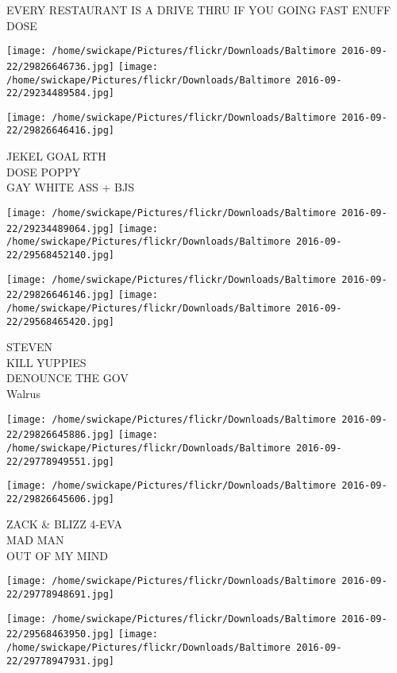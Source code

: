\documentclass[10pt,letterpaper]{article}
\begin{document}
EVERY RESTAURANT IS A DRIVE THRU IF YOU GOING FAST ENUFF\\
DOSE\\
\pagebreak

\texttt{[image: /home/swickape/Pictures/flickr/Downloads/Baltimore 2016-09-22/29826646736.jpg]}
\texttt{[image: /home/swickape/Pictures/flickr/Downloads/Baltimore 2016-09-22/29234489584.jpg]}

\vspace{0.25in}
\texttt{[image: /home/swickape/Pictures/flickr/Downloads/Baltimore 2016-09-22/29826646416.jpg]}

JEKEL GOAL RTH\\
DOSE POPPY\\
GAY WHITE ASS + BJS\\
\pagebreak

\texttt{[image: /home/swickape/Pictures/flickr/Downloads/Baltimore 2016-09-22/29234489064.jpg]}
\texttt{[image: /home/swickape/Pictures/flickr/Downloads/Baltimore 2016-09-22/29568452140.jpg]}

\texttt{[image: /home/swickape/Pictures/flickr/Downloads/Baltimore 2016-09-22/29826646146.jpg]}
\texttt{[image: /home/swickape/Pictures/flickr/Downloads/Baltimore 2016-09-22/29568465420.jpg]}

STEVEN\\
KILL YUPPIES\\
DENOUNCE THE GOV\\
Walrus\\
\pagebreak

\texttt{[image: /home/swickape/Pictures/flickr/Downloads/Baltimore 2016-09-22/29826645886.jpg]}
\texttt{[image: /home/swickape/Pictures/flickr/Downloads/Baltimore 2016-09-22/29778949551.jpg]}

\texttt{[image: /home/swickape/Pictures/flickr/Downloads/Baltimore 2016-09-22/29826645606.jpg]}

ZACK \& BLIZZ 4{-}EVA\\
MAD MAN\\
OUT OF MY MIND\\
\pagebreak

\texttt{[image: /home/swickape/Pictures/flickr/Downloads/Baltimore 2016-09-22/29778948691.jpg]}

\vspace{0.25in}
\texttt{[image: /home/swickape/Pictures/flickr/Downloads/Baltimore 2016-09-22/29568463950.jpg]}
\texttt{[image: /home/swickape/Pictures/flickr/Downloads/Baltimore 2016-09-22/29778947931.jpg]}
\end{document}
